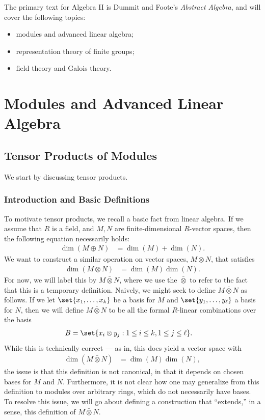 \documentclass[10pt]{mypackage}
\begin{document}
\RaggedRight
The primary text for Algebra II is Dummit and Foote's \textit{Abstract Algebra}, and will cover the following topics:
\begin{itemize}
  \item modules and advanced linear algebra;
  \item representation theory of finite groups;
  \item field theory and Galois theory.
\end{itemize}
\tableofcontents
\section{Modules and Advanced Linear Algebra}%
\subsection{Tensor Products of Modules}%
We start by discussing tensor products.
\subsubsection{Introduction and Basic Definitions}%
To motivate tensor products, we recall a basic fact from linear algebra. If we assume that $R$ is a field, and $M,N$ are finite-dimensional $R$-vector spaces, then the following equation necessarily holds:
\begin{align*}
  \dim\left( M\oplus N \right) &= \dim\left( M \right) + \dim\left( N \right).
\end{align*}
We want to construct a similar operation on vector spaces, $M\otimes N$, that satisfies
\begin{align*}
  \dim\left( M\otimes N \right) &= \dim\left( M \right)\dim\left( N \right).
\end{align*}
For now, we will label this by $M\bar{\otimes}N$, where we use the $\bar{\otimes}$ to refer to the fact that this is a temporary definition. Naively, we might seek to define $M\bar\otimes N$ as follows. If we let $\set{x_1,\dots,x_k}$ be a basis for $M$ and $\set{y_1,\dots,y_{\ell}}$ a basis for $N$, then we will define $M\bar\otimes N$ to be all the formal $R$-linear combinations over the basis
\begin{align*}
  B &= \set{x_i\otimes y_j : 1\leq i \leq k,1\leq j \leq \ell}.
\end{align*}
While this is technically correct --- as in, this does yield a vector space with
\begin{align*}
  \dim\left( M\bar\otimes N \right) &= \dim\left( M \right)\dim\left( N \right),
\end{align*}
the issue is that this definition is not canonical, in that it depends on chosen bases for $M$ and $N$. Furthermore, it is not clear how one may generalize from this definition to modules over arbitrary rings, which do not necessarily have bases. To resolve this issue, we will go about defining a construction that ``extends,'' in a sense, this definition of $M\bar\otimes N$.
\end{document}

